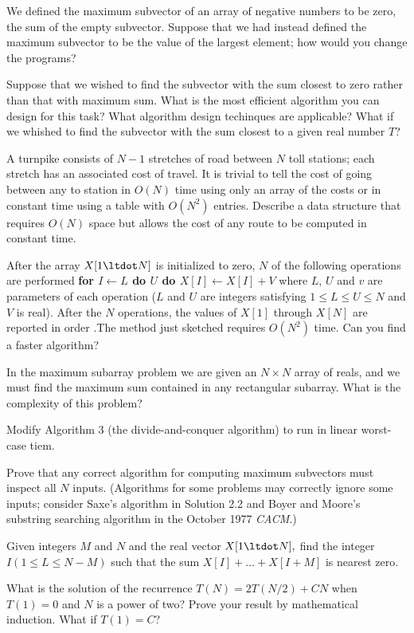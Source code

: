 \prob
We defined the maximum subvector of an array of negative numbers to be zero, the
sum of the empty subvector. Suppose that we had instead defined the maximum
subvector to be the value of the largest element; how would you change the
programs?

\prob
Suppose that we wished to find the subvector with the sum closest to zero rather
than that with maximum sum. What is the most efficient algorithm you can design
for this task? What algorithm design techinques are applicable? What if we
whished to find the subvector with the sum closest to a given real number $T$?

\prob
A turnpike consists of $N-1$ stretches of road between $N$ toll stations; each
stretch has an associated cost of travel. It is trivial to tell the cost of going
between any to station in $O(N)$ time using only an array of the costs or in
constant time using a table with $O(N^2)$ entries. Describe a data structure that
requires $O(N)$ space but allows the cost of any route to be computed in constant
time.

\prob
After the array $X[1\ltdot N]$ is initialized to zero, $N$ of the following
operations are performed
\begindisplay
\vbox{
\+\bf for $I\leftarrow L$ do $U$ do\cr
\+\quad $X[I]\leftarrow X[I]+V$\cr}
\enddisplay
where $L$, $U$ and $v$ are parameters of each operation ($L$ and $U$ are integers
satisfying $1\le L\le U\le N$ and $V$ is real). After the $N$ operations, the
values of $X[1]$ through $X[N]$ are reported in order .The method just sketched
requires $O(N^2)$ time. Can you find a faster algorithm?

\prob
In the maximum subarray problem we are given an $N\times N$ array of reals, and
we must find the maximum sum contained in any rectangular subarray. What is the
complexity of this problem?

\prob
Modify Algorithm 3 (the divide-and-conquer algorithm) to run in linear worst-case
tiem.

\prob
Prove that any correct algorithm for computing maximum subvectors must inspect
all $N$ inputs. (Algorithms for some problems may correctly ignore some inputs;
consider Saxe's algorithm in Solution 2.2 and Boyer and Moore's substring
searching algorithm in the October 1977 {\sl CACM\/}.)

\prob
Given integers $M$ and $N$ and the real vector $X[1\ltdot N],$ find the integer
$I(1\le L\le N-M)$ such that the sum $X[I]+\ldots+X[I+M]$ is nearest zero.

\prob
What is the solution of the recurrence $T(N)=2T(N/2)+CN$ when $T(1)=0$ and $N$ is
a power of two? Prove your result by mathematical induction. What if $T(1)=C$?

